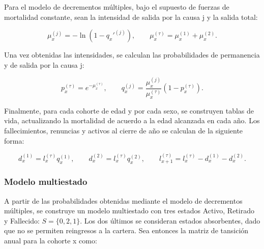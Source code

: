 \documentclass[11pt]{article}
\begin{document}
\vspace{-0.6cm}

Para el modelo de decrementos múltiples, bajo el supuesto de fuerzas de mortalidad constante, sean la intensidad de salida por la causa j y la salida total:

\vspace{-0.6cm}


$$
    \mu_x^{(j)}=-\ln(1-q_x'^{(j)}),
    \qquad
    \mu_x^{(\tau)}=\mu_x^{(1)}+\mu_x^{(2)}.
$$

\vspace{-0.2cm}

Una vez obtenidas las intensidades, se calculan las probabilidades de permanencia y de salida por la causa j:

\vspace{-1.1cm}

\begin{equation}
    p_x^{(\tau)}=e^{-\mu_x^{(\tau)}},
    \qquad
    q_x^{(j)}=
    \frac{\mu_x^{(j)}}{\mu_x^{(\tau)}}
    (1-p_x^{(\tau)}).
\end{equation}

\vspace{-0.5cm}

Finalmente, para cada cohorte de edad y por cada sexo, se construyen tablas de vida, actualizando la mortalidad de acuerdo a la edad alcanzada en cada año. Los fallecimientos, renuncias y activos al cierre de año se calculan de la siguiente forma:

\vspace{-0.5cm}

$$
    d_x^{(1)} = l_x^{(\tau)}q_x^{(1)}, \qquad
    d_x^{(2)} = l_x^{(\tau)}q_x^{(2)}, \qquad
    l_{x+1}^{(\tau)} =
    l_x^{(\tau)}-d_x^{(1)}-d_x^{(2)}.
$$

\vspace{-0.8cm}

\subsubsection*{Modelo multiestado}

\vspace{-0.5cm}


A partir de las probabilidades obtenidas mediante el modelo de decrementos múltiples, se construye un modelo multiestado con tres estados Activo, Retirado y Fallecido: $S = \{0,2,1\}$.  Los dos últimos se consideran estados absorbentes, dado que no se
permiten reingresos a la cartera. Sea entonces la matriz de tansición anual para la cohorte x como:
\end{document}
